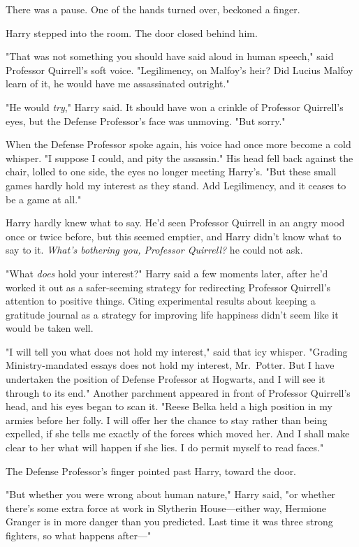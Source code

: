 There was a pause. One of the hands turned over, beckoned a finger.

Harry stepped into the room. The door closed behind him.

"That was not something you should have said aloud in human speech," said
Professor Quirrell's soft voice. "Legilimency, on Malfoy's heir? Did Lucius
Malfoy learn of it, he would have me assassinated outright."

"He would \emph{try}," Harry said. It should have won a crinkle of Professor
Quirrell's eyes, but the Defense Professor's face was unmoving. "But sorry."

When the Defense Professor spoke again, his voice had once more become a cold
whisper. "I suppose I could, and pity the assassin." His head fell back against
the chair, lolled to one side, the eyes no longer meeting Harry's. "But these
small games hardly hold my interest as they stand. Add Legilimency, and it
ceases to be a game at all."

Harry hardly knew what to say. He'd seen Professor Quirrell in an angry mood
once or twice before, but this seemed emptier, and Harry didn't know what to
say to it. \emph{What's bothering you, Professor Quirrell?} he could not
ask.

"What \emph{does} hold your interest?" Harry said a few moments later, after
he'd worked it out as a safer-seeming strategy for redirecting Professor
Quirrell's attention to positive things. Citing experimental results about
keeping a gratitude journal as a strategy for improving life happiness didn't
seem like it would be taken well.

"I will tell you what does not hold my interest," said that icy whisper.
"Grading Ministry-mandated essays does not hold my interest, Mr.~Potter. But I
have undertaken the position of Defense Professor at Hogwarts, and I will see
it through to its end." Another parchment appeared in front of Professor
Quirrell's head, and his eyes began to scan it. "Reese Belka held a high
position in my armies before her folly. I will offer her the chance to stay
rather than being expelled, if she tells me exactly of the forces which moved
her. And I shall make clear to her what will happen if she lies. I do permit
myself to read faces."

The Defense Professor's finger pointed past Harry, toward the door.

"But whether you were wrong about human nature," Harry said, "or whether
there's some extra force at work in Slytherin House---either way, Hermione
Granger is in more danger than you predicted. Last time it was three strong
fighters, so what happens after---"


